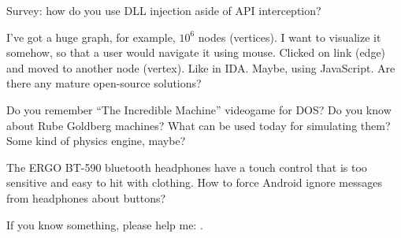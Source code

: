 \myhrule{}

Survey: how do you use DLL injection aside of API interception?

\myhrule{}

I've got a huge graph, for example, $10^6$ nodes (vertices).
I want to visualize it somehow, so that a user would navigate it using mouse.
Clicked on link (edge) and moved to another node (vertex).
Like in IDA.
Maybe, using JavaScript.
Are there any mature open-source solutions?

\myhrule{}

Do you remember ``The Incredible Machine'' videogame for DOS?
Do you know about Rube Goldberg machines?
What can be used today for simulating them?
Some kind of physics engine, maybe?

\myhrule{}

The ERGO BT-590 bluetooth headphones have a touch control that is too sensitive and easy to hit with clothing.
How to force Android ignore messages from headphones about buttons?

\myhrule{}

If you know something, please help me: \EMAILS{}.

